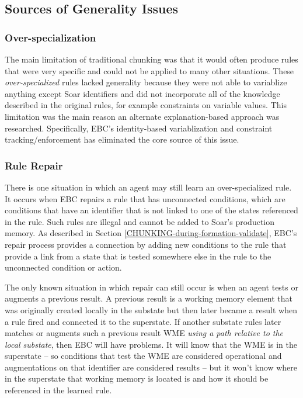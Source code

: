 \subsection{Sources of Generality Issues}

\subsubsection{Over-specialization}

The main limitation of traditional chunking was that it would often produce rules that were very specific and could not be applied to many other situations. These \textit{over-specialized} rules lacked generality because they were not able to variablize anything except Soar identifiers and did not incorporate all of the knowledge described in the original rules, for example constraints on variable values.  This limitation was the main reason an alternate explanation-based approach was researched.  Specifically, EBC's identity-based variablization and constraint tracking/enforcement has eliminated the core source of this issue.

\subsubsection{Rule Repair}

There is one situation in which an agent may still learn an over-specialized rule.  It occurs when EBC repairs a rule that has unconnected conditions, which are conditions that have an identifier that is not linked to one of the states referenced in the rule.  Such rules are illegal and cannot be added to Soar's production memory. As described in Section \ref{CHUNKING-during-formation-validate}, EBC's repair process provides a connection by adding new conditions to the rule that provide a link from a state that is tested somewhere else in the rule to the unconnected condition or action. 

The only known situation in which repair can still occur is when an agent tests or augments a previous result.  A previous result is a working memory element that was originally created locally in the substate but then later became a result when a rule fired and connected it to the superstate.  If another substate rules later matches or augments such a previous result WME \emph{using a path relative to the local substate}, then EBC will have problems.  It will know that the WME is in the superstate -- so conditions that test the WME are considered operational and augmentations on that identifier are considered results -- but it won't know where in the superstate that working memory is located is and how it should be referenced in the learned rule. 

